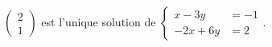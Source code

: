 $\begin{pmatrix}2\\1\end{pmatrix}$ est l'unique solution de $\begin{cases}x-3y &= -1 \\ -2x+6y &= 2\end{cases}$.

\begin{reponses}
\end{reponses}

